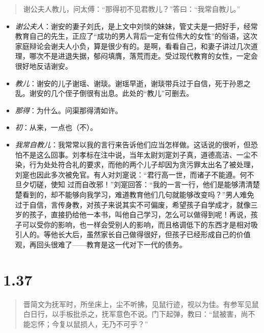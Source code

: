 \documentclass[]{book}
\providecommand{\tightlist}{%
  \setlength{\itemsep}{0pt}\setlength{\parskip}{0pt}}
\begin{document}
\begin{quote}
谢公夫人教儿，问太傅：``那得初不见君教儿？''答曰：``我常自教儿。''
\end{quote}

\begin{itemize}
\tightlist
\item
  \emph{谢公夫人}：谢安的妻子刘氏，是上文中刘惔的妹妹，管丈夫是一把好手，经常教育自己的先生，正应了``成功的男人背后一定有位伟大的女性''的俗语，这次家庭辩论会谢夫人小负，算是很少有的。是啊，看看自己，和妻子讲过几次道理，哪次不是进退失据，郁闷填膺，落荒而走。受过现代教育的女性，一定会很好地反诘谢安。
\item
  \emph{教儿}：谢安的儿子谢瑶、谢琰。谢瑶早逝，谢琰带兵过于自信，死于孙恩之乱。谢安的几个侄子倒很有出息。此处的``教儿''可删去。
\item
  \emph{那得}：为什么。问渠那得清如许。
\item
  \emph{初}：从来，一点也（不）。
\item
  \emph{我常自教儿}：我常常以我的言行来告诉他们应当怎样做。这话说的很听，但恐怕不是这么回事。刘孝标在注中说，当年太尉刘寔刘子真，道德高洁、一尘不染，行为处处符合礼的要求，而他的两个儿子却因为贪污罪太出名了被处理，刘寔也因此多次被免官。有人对刘寔说：``君行高一世，而诸子不能遵。何不旦夕切磋，使知
  过而自改邪！''刘寔回答：``我的一言一行，他们是能够清清楚楚看到的，却不能够向我学习，难道教育他们几句就能够改变吗？''男人难免过于自信，言传身教，对孩子来说其实不可偏废，希望孩子自学成才，就像三岁的孩子，直接扔给他一本书，叫他自己学习，怎么可以做得到呢！再说，孩子可以受你的影响，也一样会受别人的影响，而且格调低下的东西才是相对吸引人的。等他长大后，虽然家长自己做得很好，但孩子已经形成自己的价值观，再回头很难了------教育是这一代对下一代的债务。
\end{itemize}

\section{1.37}\label{section-36}

\begin{quote}
晋简文为抚军时，所坐床上，尘不听拂，见鼠行迹，视以为佳。有参军见鼠白日行，以手板批杀之，抚军意色不说。门下起弹，教曰：``鼠被害，尚不能忘怀；今复以鼠损人，无乃不可乎？''
\end{quote}
\end{document}
